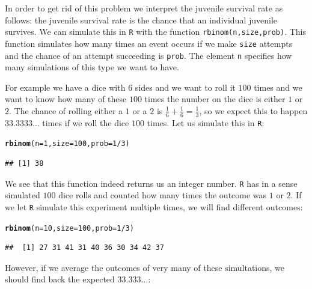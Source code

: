 \documentclass{article}\usepackage[]{graphicx}\usepackage[]{color}
\makeatletter
\newcommand{\hlnum}[1]{\textcolor[rgb]{0.686,0.059,0.569}{#1}}%
\newcommand{\hlopt}[1]{\textcolor[rgb]{0,0,0}{#1}}%
\newcommand{\hlstd}[1]{\textcolor[rgb]{0.345,0.345,0.345}{#1}}%
\newcommand{\hlkwc}[1]{\textcolor[rgb]{0.333,0.667,0.333}{#1}}%
\newcommand{\hlkwd}[1]{\textcolor[rgb]{0.737,0.353,0.396}{\textbf{#1}}}%
\newenvironment{kframe}{%
 \def\at@end@of@kframe{}%
 \ifinner\ifhmode%
  \def\at@end@of@kframe{\end{minipage}}%
  \begin{minipage}{\columnwidth}%
 \fi\fi%
 \def\FrameCommand##1{\hskip\@totalleftmargin \hskip-\fboxsep
 \colorbox{shadecolor}{##1}\hskip-\fboxsep
     \hskip-\linewidth \hskip-\@totalleftmargin \hskip\columnwidth}%
 \MakeFramed {\advance\hsize-\width
   \@totalleftmargin\z@ \linewidth\hsize
   \@setminipage}}%
 {\par\unskip\endMakeFramed%
 \at@end@of@kframe}
\newenvironment{knitrout}{}{} %
\makeatother
\begin{document}
In order to get rid of this problem we interpret the juvenile survival rate as follows: the juvenile survival rate is the chance that an individual juvenile survives. We can simulate this in \texttt{R} with the function \texttt{rbinom(n,size,prob)}. This function simulates how many times an event occurs if we make \texttt{size} attempts and the chance of an attempt succeeding is \texttt{prob}. The element \texttt{n} specifies how many simulations of this type we want to have.

For example we have a dice with 6 sides and we want to roll it $100$ times and we want to know how many of these $100$ times the number on the dice is either $1$ or $2$. The chance of rolling either a $1$ or a $2$ is $\frac{1}{6}+\frac{1}{6}=\frac{1}{3}$, so we expect this to happen $33.3333\dots$ times if we roll the dice $100$ times. Let us simulate this in \texttt{R}:
\begin{knitrout}
\color{fgcolor}\begin{kframe}
\begin{alltt}
\hlkwd{rbinom}\hlstd{(}\hlkwc{n}\hlstd{=}\hlnum{1}\hlstd{,}\hlkwc{size}\hlstd{=}\hlnum{100}\hlstd{,}\hlkwc{prob}\hlstd{=}\hlnum{1}\hlopt{/}\hlnum{3}\hlstd{)}
\end{alltt}
\begin{verbatim}
## [1] 38
\end{verbatim}
\end{kframe}
\end{knitrout}
We see that this function indeed returns us an integer number. \texttt{R} has in a sense simulated $100$ dice rolls and counted how many times the outcome was $1$ or $2$. If we let \texttt{R} simulate this experiment multiple times, we will find different outcomes:
\begin{knitrout}
\color{fgcolor}\begin{kframe}
\begin{alltt}
\hlkwd{rbinom}\hlstd{(}\hlkwc{n}\hlstd{=}\hlnum{10}\hlstd{,}\hlkwc{size}\hlstd{=}\hlnum{100}\hlstd{,}\hlkwc{prob}\hlstd{=}\hlnum{1}\hlopt{/}\hlnum{3}\hlstd{)}
\end{alltt}
\begin{verbatim}
##  [1] 27 31 41 31 40 36 30 34 42 37
\end{verbatim}
\end{kframe}
\end{knitrout}
However, if we average the outcomes of very many of these simultations, we should find back the expected $33.333\dots$:
\end{document}
